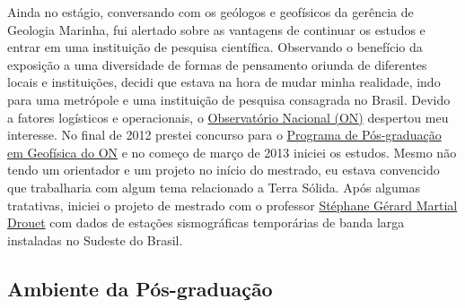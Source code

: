 \documentclass[10pt,a4paper,oneside]{book}
\begin{document}
Ainda no estágio, conversando com os geólogos e geofísicos da gerência de Geologia Marinha, fui alertado sobre as vantagens de continuar os estudos e entrar em uma instituição de pesquisa científica. Observando o benefício da exposição a uma diversidade de formas de pensamento oriunda de diferentes locais e instituições, decidi que estava na hora de mudar minha realidade, indo para uma metrópole e uma instituição de pesquisa consagrada no Brasil. Devido a fatores logísticos e operacionais, o \href{https://www.gov.br/observatorio/pt-br}{Observatório Nacional (ON)} despertou meu interesse. No final de 2012 prestei concurso para o \href{https://www.gov.br/observatorio/pt-br/assuntos/programas-academicos/pos-graduacao-em-geofisica}{Programa de Pós-graduação em Geofísica do ON} e no começo de março de 2013 iniciei os estudos. Mesmo não tendo um orientador e um projeto no início do mestrado, eu estava convencido que trabalharia com algum tema relacionado a Terra Sólida. Após algumas tratativas, iniciei o projeto de mestrado com o professor \href{http://lattes.cnpq.br/0563544084744404}{Stéphane Gérard Martial Drouet} com dados de estações sismográficas temporárias de banda larga instaladas no Sudeste do Brasil.

\subsection{Ambiente da Pós-graduação}
\label{sec_posgrad_on}
\end{document}
